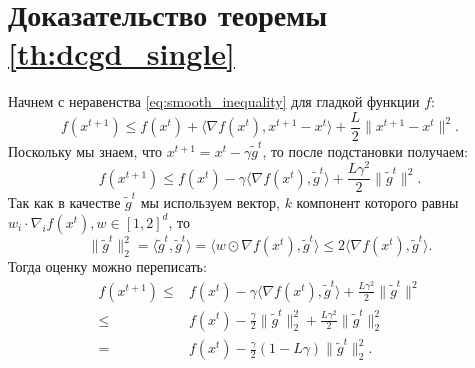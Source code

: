 \section{Доказательство теоремы \ref{th:dcgd_single}} \label{app:dcgd_single_proof}
    Начнем с неравенства \eqref{eq:smooth_inequality} для гладкой функции $f$:
    \begin{equation*}
        f(x^{t + 1}) \leq f(x^t) + \langle \nabla f(x^t), x^{t + 1} - x^t \rangle + \frac{L}{2} \|x^{t + 1} - x^t\|^2.
    \end{equation*}
    Поскольку мы знаем, что $x^{t + 1} = x^t - \gamma \tilde{g}^t$, то после подстановки получаем:
    \begin{equation*}
        f(x^{t + 1}) \leq f(x^t) - \gamma \langle \nabla f(x^t), \tilde{g}^t \rangle + \frac{L \gamma^2}{2} \|\tilde{g}^t\|^2.
    \end{equation*}
    Так как в качестве $\tilde{g}^t$ мы используем вектор, $k$ компонент которого равны $w_i \cdot \nabla_i f(x^t), w \in [1, 2]^d$, то
    \begin{equation*}
        \|\tilde{g}^t\|_2^2 = \langle \tilde{g}^t, \tilde{g}^t \rangle = \langle w \odot \nabla f(x^t), \tilde{g}^t \rangle \leq 2  \langle \nabla f(x^t), \tilde{g}^t \rangle.
    \end{equation*}
    Тогда оценку можно переписать:
    \begin{align*}
        f(x^{t + 1}) \leq& f(x^t) - \gamma \langle \nabla f(x^t), \tilde{g}^t \rangle + \frac{L \gamma^2}{2} \|\tilde{g}^t\|^2 \\
        \leq& f(x^t) - \frac{\gamma}{2} \|\tilde{g}^t\|_2^2 + \frac{L \gamma^2}{2} \|\tilde{g}^t\|_2^2 \\
        =& f(x^t) - \frac{\gamma}{2} (1 - L \gamma) \|\tilde{g}^t\|_2^2.
    \end{align*}
